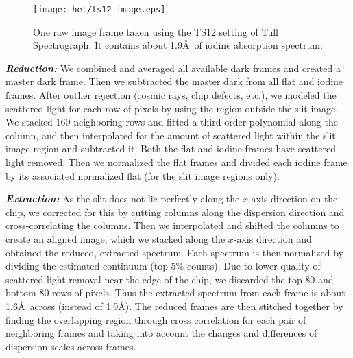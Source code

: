\begin{figure}
\centering
\texttt{[image: het/ts12\_image.eps]}
\caption{One raw image frame taken using the TS12 setting of Tull
  Spectrograph. It contains about 1.9\AA\ of iodine absorption spectrum. 
\label{het:fig:ts12image}}
\end{figure}


\textbf{\textit{Reduction:}} We combined and averaged all available
dark frames and created a master dark frame. Then we subtracted the
master dark from all flat and iodine frames. After outlier rejection
(cosmic rays, chip defects, etc.), we modeled the scattered light for
each row of pixels by using the region outside the slit image.  We
stacked 160 neighboring rows and fitted a third order polynomial along
the column, and then interpolated for the amount of scattered light
within the slit image region and subtracted it. Both the flat and
iodine frames have scattered light removed. Then we normalized the
flat frames and divided each iodine frame by its associated normalized
flat (for the slit image regions only).

\textbf{\textit{Extraction:}} As the slit does not lie perfectly along
the $x$-axis direction on the chip, we corrected for this by cutting
columns along the dispersion direction and cross-correlating the
columns. Then we interpolated and shifted the columns to create an
aligned image, which we stacked along the $x$-axis direction and
obtained the reduced, extracted spectrum. Each spectrum is then
normalized by dividing the estimated continuum (top 5\% counts). Due
to lower quality of scattered light removal near the edge of the chip,
we discarded the top 80 and bottom 80 rows of pixels. Thus the
extracted spectrum from each frame is about 1.6\AA\ across (instead of
1.9\AA). The reduced frames are then stitched together by finding
the overlapping region through cross correlation for each pair of
neighboring frames and taking into account the changes and differences
of dispersion scales across frames.

